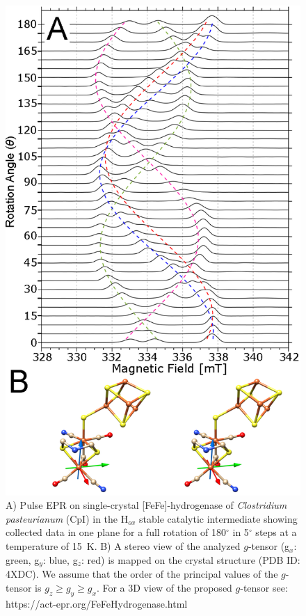 \begin{figure}[htbp]
\centering
 \includegraphics{Kapitel/Ch5-Images/04-FeFe-xTal-DataBig.eps}
 \caption[Pulse EPR on single-crystal of the H-cluster in FeFe-hydrogenase.]{A) Pulse EPR on single-crystal [FeFe]-hydrogenase of {\em Clostridium pasteurianum} (CpI) in the H$_{ox}$ stable catalytic intermediate showing collected data in one plane for a full rotation of 180$^{\circ}$ in 5$^{\circ}$ steps at a temperature of 15~K. B) A stereo view of the analyzed $g$-tensor (g$_x$: green, g$_y$: blue, g$_z$: red) is mapped on the crystal structure (PDB ID: 4XDC). We assume that the order of the principal values of the $g$-tensor is $g_z\geq g_y\geq g_x$. For a 3D view of the proposed $g$-tensor see: https://act-epr.org/FeFeHydrogenase.html} 
 \label{fig:xTalFeFe}
\end{figure}

